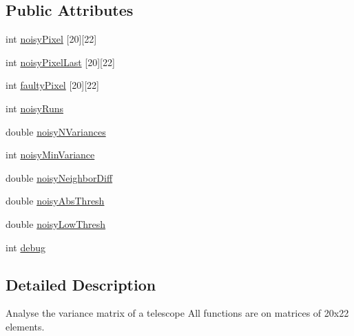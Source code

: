 \subsection*{Public Attributes}
\begin{DoxyCompactItemize}
\item 
int \hyperlink{classanalyseMatrix_a7309694bc069cc545ddb80de2cf96cb8}{noisy\-Pixel} \mbox{[}20\mbox{]}\mbox{[}22\mbox{]}
\item 
int \hyperlink{classanalyseMatrix_ae1a917330c3aa0e9ee6446d14f31eed3}{noisy\-Pixel\-Last} \mbox{[}20\mbox{]}\mbox{[}22\mbox{]}
\item 
int \hyperlink{classanalyseMatrix_a8cddd52641a8d1dc2a6cf669584ac440}{faulty\-Pixel} \mbox{[}20\mbox{]}\mbox{[}22\mbox{]}
\item 
int \hyperlink{classanalyseMatrix_af4911f335c7415683cac99607ee3972d}{noisy\-Runs}
\item 
double \hyperlink{classanalyseMatrix_a1e35cc039abe9757861c13ad48b73134}{noisy\-N\-Variances}
\item 
int \hyperlink{classanalyseMatrix_adb3542dfa480b47bdc51442a1980821a}{noisy\-Min\-Variance}
\item 
double \hyperlink{classanalyseMatrix_a8a8c6af9d824a68930c5307517e050f5}{noisy\-Neighbor\-Diff}
\item 
double \hyperlink{classanalyseMatrix_ab2c3e6805f8c69bb1c2317df1130cffd}{noisy\-Abs\-Thresh}
\item 
double \hyperlink{classanalyseMatrix_a66744956a995f194e5a018da3aaedc12}{noisy\-Low\-Thresh}
\item 
int \hyperlink{classanalyseMatrix_a5c3dd03672f12a8a3ad1adbbe15d3a3e}{debug}
\end{DoxyCompactItemize}


\subsection{Detailed Description}
Analyse the variance matrix of a telescope All functions are on matrices of 20x22 elements. 

